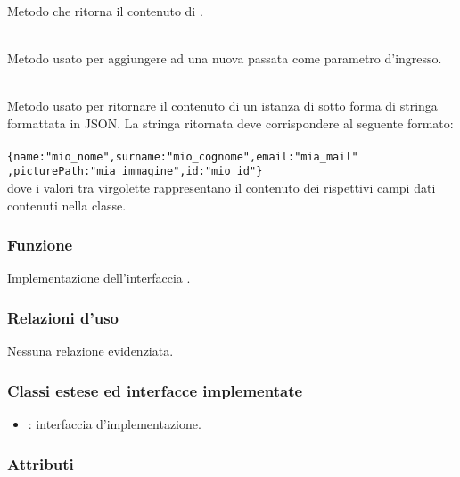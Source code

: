 \begin{description}
	\item{}\\
	Metodo che ritorna il contenuto di .
	\item{}\\
	Metodo usato per aggiungere ad  una nuova  passata come parametro d'ingresso.
	\item{}\\
	Metodo usato per ritornare il contenuto di un istanza di  sotto forma di stringa formattata in JSON. La stringa ritornata deve corrispondere al seguente formato:\\\\
	\verb|{name:"mio_nome",surname:"mio_cognome",email:"mia_mail"|\\\verb|,picturePath:"mia_immagine",id:"mio_id"}|\\
	
	dove i valori tra virgolette rappresentano il contenuto dei rispettivi campi dati contenuti nella classe.
\end{description}


\subsubsection*{Funzione}
Implementazione dell'interfaccia .

\subsubsection*{Relazioni d'uso}

Nessuna relazione evidenziata.

\subsubsection*{Classi estese ed interfacce implementate}
\begin{itemize}
	\item {}: interfaccia d'implementazione.
\end{itemize}


\subsubsection*{Attributi}

